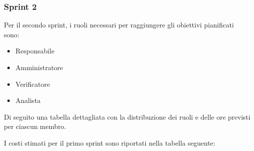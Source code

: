 



\subsubsection{Sprint 2}
Per il secondo sprint, i ruoli necessari per raggiungere gli obiettivi
pianificati sono:
\begin{itemize}
    \item Responsabile
    \item Amministratore
    \item Verificatore
    \item Analista
\end{itemize}

\newpage
Di seguito una tabella dettagliata con la distribuzione dei ruoli e delle ore previsti per ciascun membro.




I costi stimati per il primo sprint sono riportati nella tabella seguente:




